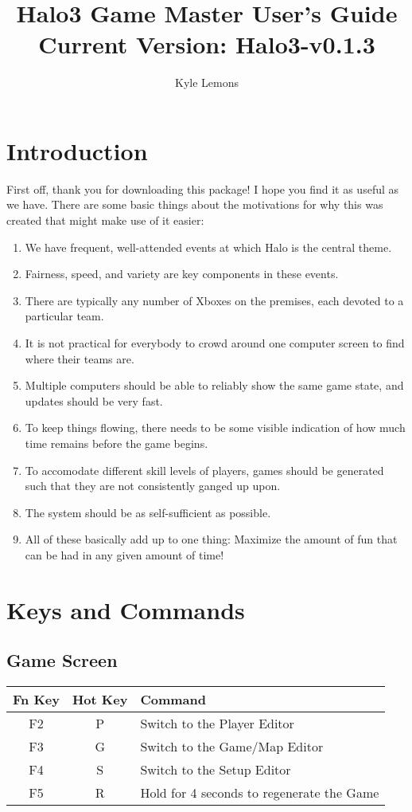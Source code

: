 \documentclass[10pt,a4paper]{report}
\author{Kyle Lemons}
\title{Halo3 Game Master User's Guide \\
{\large{Current Version: Halo3-v0.1.3}}}
\begin{document}
\maketitle
\tableofcontents
\pagebreak

\chapter{Introduction}
First off, thank you for downloading this package!  I hope you find it as useful as we have.
There are some basic things about the motivations for why this was created that might make use of it easier:
\begin{enumerate}
\item We have frequent, well-attended events at which Halo is the central theme.
\item Fairness, speed, and variety are key components in these events.
\item There are typically any number of Xboxes on the premises, each devoted to a particular team.
\item It is not practical for everybody to crowd around one computer screen to find where their teams are.
\item Multiple computers should be able to reliably show the same game state, and updates should be very fast.
\item To keep things flowing, there needs to be some visible indication of how much time remains before the game begins.
\item To accomodate different skill levels of players, games should be generated such that they are not consistently ganged up upon.
\item The system should be as self-sufficient as possible.
\item All of these basically add up to one thing: Maximize the amount of fun that can be had in any given amount of time!
\end{enumerate}

\chapter{Keys and Commands}
\section{Game Screen}
\begin{tabular}{c|c|l}
Fn Key & Hot Key & Command \\
\hline
F2 & P & Switch to the Player Editor \\
F3 & G & Switch to the Game/Map Editor \\
F4 & S & Switch to the Setup Editor \\
F5 & R & Hold for 4 seconds to regenerate the Game \\
\end{tabular}
\end{document}
